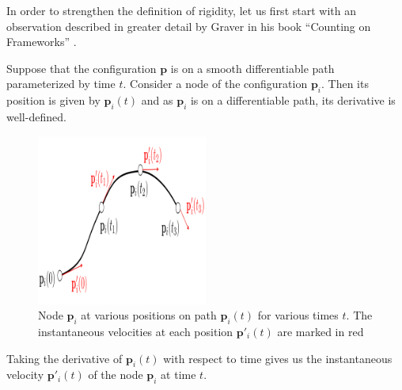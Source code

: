 \begin{flushleft}
In order to strengthen the definition of rigidity, let us first start with an observation described in greater detail by Graver in his book ``Counting on Frameworks'' \cite{counting_frameworks}. 
\end{flushleft}

\begin{flushleft}
Suppose that the configuration $\mathbf{p}$ is on a smooth differentiable path parameterized by time $t$. Consider a node of the configuration $\mathbf{p}_i$. Then its position is given by $\mathbf{p}_i(t)$ and as $\mathbf{p}_i$ is on a differentiable path, its derivative is well-defined.

\begin{figure}[htbp]
    \centering
    \includegraphics[width = 0.5\textwidth]{Chapter 2/12. path.png}
    \caption{Node $\mathbf{p}_i$ at various positions on path $\mathbf{p}_i(t)$ for various times $t$. The instantaneous velocities at each position $\mathbf{p}'_i(t)$ are marked in red}
    \label{fig: path}
\end{figure}
\end{flushleft}

\noindent
Taking the derivative of $\mathbf{p}_i(t)$ with respect to time gives us the instantaneous velocity $\mathbf{p}'_i(t)$ of the node $\mathbf{p}_i$ at time $t$.

